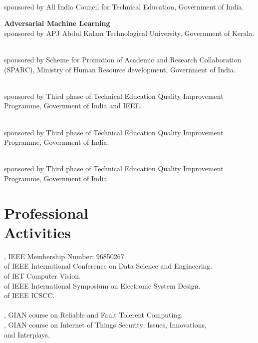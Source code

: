 \documentclass[mm]{simple_style}
\begin{document}
\begin{resume}
  \\
sponsored by All India Council for Technical Education, Government of India. 

\textbf{Adversarial Machine Learning}   \\
sponsored by APJ Abdul Kalam Technological University, Government of Kerala.

  \\
sponsored by Scheme for Promotion of Academic and Research Collaboration (SPARC), Ministry of Human Resource development, Government of India. 

  \\ 
sponsored by Third phase of Technical Education Quality Improvement Programme, Government of India and IEEE.

  \\
sponsored by Third phase of Technical Education Quality Improvement Programme, Government of India. 

  \\
sponsored by Third phase of Technical Education Quality Improvement Programme, Government of India.

\vspace{-2ex}
\sectionline

\section{Professional \\Activities}

, IEEE Membership Number: 96850267. \\
 of IEEE International Conference on Data Science and Engineering. \\
 of IET Computer Vision. \\
 of IEEE International Symposium on Electronic System Design. \\
 of IEEE ICSCC. \\ \\
, GIAN course on Reliable and Fault Tolerent Computing.  \\
, GIAN course on Internet of Things Security: Issues, Innovations, \\and Interplays.


\end{resume}
\end{document}
